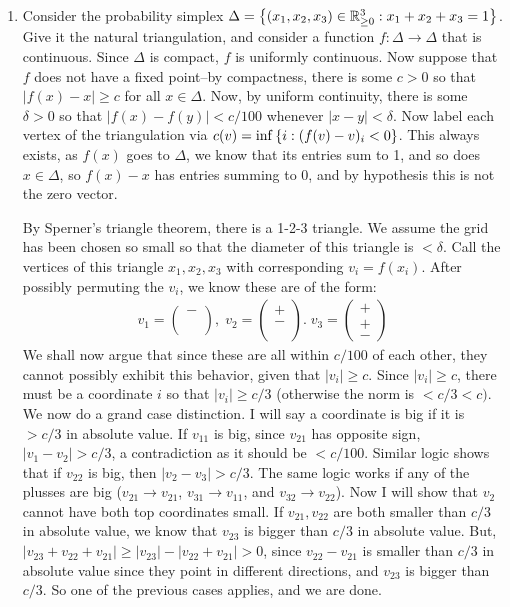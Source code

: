 \documentclass[12pt]{article}
\theoremstyle{definitionstyle}
\def\mbb#1{\mathbb{#1}}
\def\R{\mbb{R}}
\newcommand{\SET}[1]{\Set{\mskip-\medmuskip #1 \mskip-\medmuskip}}
\newcommand{\1}{\mathds 1}
\begin{document}
\begin{enumerate}
        \item Consider the probability simplex $\Delta = \SET{(x_1, x_2, x_3) \in \R^3_{\geq 0} : x_1+x_2+x_3 = 1}$. Give it the natural triangulation, and consider a function $f: \Delta \to \Delta$ that is continuous. Since $\Delta$ is compact, $f$ is uniformly continuous. Now suppose that $f$ does not have a fixed point--by compactness, there is some $c > 0$ so that $|f(x)-x| \geq c$ for all $x \in \Delta$. Now, by uniform continuity, there is some $\delta > 0$ so that $|f(x)-f(y)| < c/100$ whenever $|x-y| < \delta$. Now label each vertex of the triangulation via $c(v) = \inf \SET{i : (f(v)-v)_i < 0}$. This always exists, as $f(x)$ goes to $\Delta$, we know that its entries sum to 1, and so does $x \in \Delta$, so $f(x) - x$ has entries summing to 0, and by hypothesis this is not the zero vector.

        By Sperner's triangle theorem, there is a 1-2-3 triangle. We assume the grid has been chosen so small so that the diameter of this triangle is $<\delta$. Call the vertices of this triangle $x_1, x_2, x_3$ with corresponding $v_i = f(x_i)$. After possibly permuting the $v_i$, we know these are of the form:
        \begin{align*}
            v_1 = \begin{pmatrix}
                - \\ \\ \\
            \end{pmatrix}, \;
            v_2 = \begin{pmatrix}
                + \\ - \\ \\
            \end{pmatrix}. \;
            v_3 = \begin{pmatrix}
                + \\ + \\ -
            \end{pmatrix}
        \end{align*}
        We shall now argue that since these are all within $c/100$ of each other, they cannot possibly exhibit this behavior, given that $|v_i| \geq c$. Since $|v_i| \geq c$, there must be a coordinate $i$ so that $|v_i| \geq c/3$ (otherwise the norm is $< c/3 < c)$. We now do a grand case distinction. I will say a coordinate is big if it is $>c/3$ in absolute value. If $v_{11}$ is big, since $v_{21}$ has opposite sign, $|v_1 - v_2| > c/3$, a contradiction as it should be $<c/100$. Similar logic shows that if $v_{22}$ is big, then $|v_2 - v_3| > c/3$. The same logic works if any of the plusses are big ($v_{21} \to v_{21}$, $v_{31} \to v_{11}$, and $v_{32} \to v_{22}$). Now I will show that $v_2$ cannot have both top coordinates small. If $v_{21}, v_{22}$ are both smaller than $c/3$ in absolute value, we know that $v_{23}$ is bigger than $c/3$ in absolute value. But, $|v_{23} + v_{22} + v_{21}| \geq |v_{23}| - |v_{22} + v_{21}| > 0$, since $v_{22} - v_{21}$ is smaller than $c/3$ in absolute value since they point in different directions, and $v_{23}$ is bigger than $c/3$. So one of the previous cases applies, and we are done. 


\end{enumerate}
\end{document}
